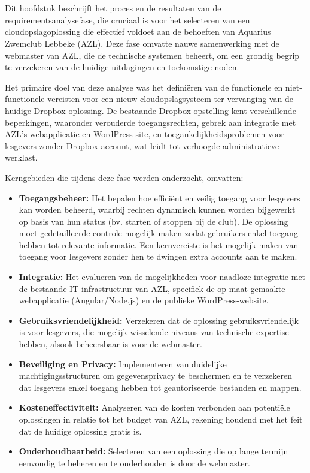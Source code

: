 \chapter{}
\label{ch:requirement-analyse}

Dit hoofdstuk beschrijft het proces en de resultaten van de requirementsanalysefase, die cruciaal is voor het selecteren van een cloudopslagoplossing die effectief voldoet aan de behoeften van Aquarius Zwemclub Lebbeke (AZL). Deze fase omvatte nauwe samenwerking met de webmaster van AZL, die de technische systemen beheert, om een grondig begrip te verzekeren van de huidige uitdagingen en toekomstige noden.

Het primaire doel van deze analyse was het definiëren van de functionele en niet-functionele vereisten voor een nieuw cloudopslagsysteem ter vervanging van de huidige Dropbox-oplossing. De bestaande Dropbox-opstelling kent verschillende beperkingen, waaronder verouderde toegangsrechten, gebrek aan integratie met AZL's webapplicatie en WordPress-site, en toegankelijkheidsproblemen voor lesgevers zonder Dropbox-account, wat leidt tot verhoogde administratieve werklast.

Kerngebieden die tijdens deze fase werden onderzocht, omvatten:

\begin{itemize}
    \item \textbf{Toegangsbeheer:} Het bepalen hoe efficiënt en veilig toegang voor lesgevers kan worden beheerd, waarbij rechten dynamisch kunnen worden bijgewerkt op basis van hun status (bv. starten of stoppen bij de club). De oplossing moet gedetailleerde controle mogelijk maken zodat gebruikers enkel toegang hebben tot relevante informatie. Een kernvereiste is het mogelijk maken van toegang voor lesgevers zonder hen te dwingen extra accounts aan te maken.
    \item \textbf{Integratie:} Het evalueren van de mogelijkheden voor naadloze integratie met de bestaande IT-infrastructuur van AZL, specifiek de op maat gemaakte webapplicatie (Angular/Node.js) en de publieke WordPress-website.
    \item \textbf{Gebruiksvriendelijkheid:} Verzekeren dat de oplossing gebruiksvriendelijk is voor lesgevers, die mogelijk wisselende niveaus van technische expertise hebben, alsook beheersbaar is voor de webmaster.
    \item \textbf{Beveiliging en Privacy:} Implementeren van duidelijke machtigingsstructuren om gegevensprivacy te beschermen en te verzekeren dat lesgevers enkel toegang hebben tot geautoriseerde bestanden en mappen.
    \item \textbf{Kosteneffectiviteit:} Analyseren van de kosten verbonden aan potentiële oplossingen in relatie tot het budget van AZL, rekening houdend met het feit dat de huidige oplossing gratis is.
    \item \textbf{Onderhoudbaarheid:} Selecteren van een oplossing die op lange termijn eenvoudig te beheren en te onderhouden is door de webmaster.
\end{itemize}

